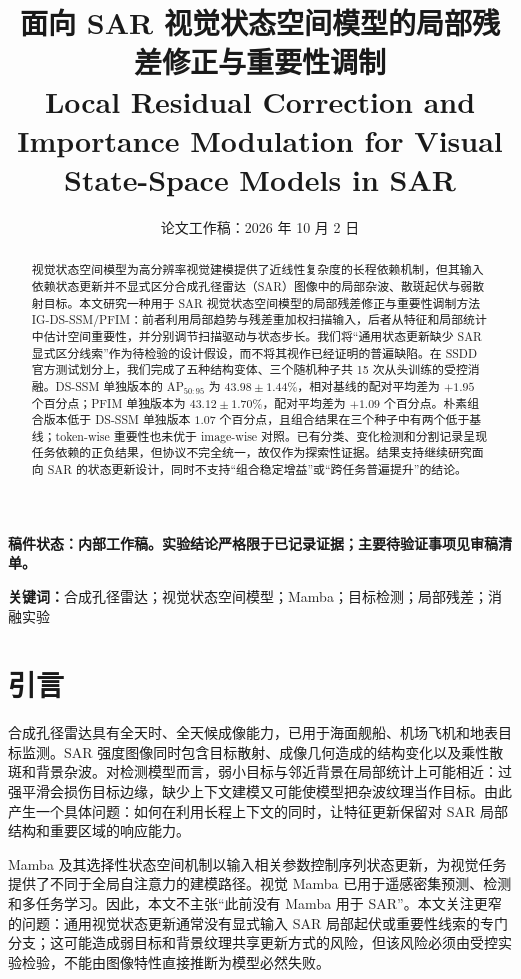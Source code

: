 \documentclass[UTF8,12pt,a4paper]{ctexart}
\title{面向 SAR 视觉状态空间模型的局部残差修正与重要性调制\\
\large Local Residual Correction and Importance Modulation for Visual State-Space Models in SAR}
\author{}
\date{论文工作稿：2026 年 10 月 2 日}
\begin{document}
\maketitle
\begin{center}
\textbf{稿件状态：内部工作稿。实验结论严格限于已记录证据；主要待验证事项见审稿清单。}
\end{center}
\begin{abstract}
视觉状态空间模型为高分辨率视觉建模提供了近线性复杂度的长程依赖机制，但其输入依赖状态更新并不显式区分合成孔径雷达（SAR）图像中的局部杂波、散斑起伏与弱散射目标。本文研究一种用于 SAR 视觉状态空间模型的局部残差修正与重要性调制方法 IG-DS-SSM/PFIM：前者利用局部趋势与残差重加权扫描输入，后者从特征和局部统计中估计空间重要性，并分别调节扫描驱动与状态步长。我们将“通用状态更新缺少 SAR 显式区分线索”作为待检验的设计假设，而不将其视作已经证明的普遍缺陷。在 SSDD 官方测试划分上，我们完成了五种结构变体、三个随机种子共 15 次从头训练的受控消融。DS-SSM 单独版本的 AP$_{50:95}$ 为 $43.98\pm1.44\%$，相对基线的配对平均差为 $+1.95$ 个百分点；PFIM 单独版本为 $43.12\pm1.70\%$，配对平均差为 $+1.09$ 个百分点。朴素组合版本低于 DS-SSM 单独版本 $1.07$ 个百分点，且组合结果在三个种子中有两个低于基线；token-wise 重要性也未优于 image-wise 对照。已有分类、变化检测和分割记录呈现任务依赖的正负结果，但协议不完全统一，故仅作为探索性证据。结果支持继续研究面向 SAR 的状态更新设计，同时不支持“组合稳定增益”或“跨任务普遍提升”的结论。
\end{abstract}
\noindent\textbf{关键词：}合成孔径雷达；视觉状态空间模型；Mamba；目标检测；局部残差；消融实验

\section{引言}
合成孔径雷达具有全天时、全天候成像能力，已用于海面舰船、机场飞机和地表目标监测。SAR 强度图像同时包含目标散射、成像几何造成的结构变化以及乘性散斑和背景杂波。对检测模型而言，弱小目标与邻近背景在局部统计上可能相近：过强平滑会损伤目标边缘，缺少上下文建模又可能使模型把杂波纹理当作目标。由此产生一个具体问题：如何在利用长程上下文的同时，让特征更新保留对 SAR 局部结构和重要区域的响应能力。

Mamba 及其选择性状态空间机制以输入相关参数控制序列状态更新，为视觉任务提供了不同于全局自注意力的建模路径\cite{gu2023mamba,liu2024visionmamba}。视觉 Mamba 已用于遥感密集预测、检测和多任务学习\cite{rs_mamba,rstmtmamba,mambayolo,madinet}。因此，本文不主张“此前没有 Mamba 用于 SAR”。本文关注更窄的问题：通用视觉状态更新通常没有显式输入 SAR 局部起伏或重要性线索的专门分支；这可能造成弱目标和背景纹理共享更新方式的风险，但该风险必须由受控实验检验，不能由图像特性直接推断为模型必然失败。
\end{document}
